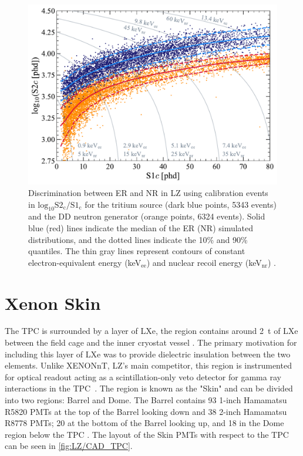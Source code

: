 \begin{figure}[!ht]
    \centering
    \includegraphics[width=0.7\linewidth]{figures/LZ/SR1WS_calOnly_0629.pdf}
    \caption[Discrimination between ER and NR in LZ using calibration events.]{Discrimination between ER and NR in LZ using calibration events in $\text{log}_{10}\text{S2}_{\text{c}}/\text{S1}_{\text{c}}$ for the tritium source (dark blue points, 5343 events) and the DD neutron generator (orange points, 6324 events). Solid blue (red) lines indicate the median of the ER (NR) simulated distributions, and the dotted lines indicate the 10\% and 90\% quantiles. The thin gray lines represent contours of constant electron-equivalent energy (keV$_{\text{ee}}$) and nuclear recoil energy (keV$_{\text{nr}}$) \cite{LZ:2022lsv}.}
    \label{fig:LZ/NRERBandExample}
\end{figure}

\section{Xenon Skin}\label{sec:LZ/Skin}
The TPC is surrounded by a layer of LXe, the region contains around 2~t of LXe between the field cage and the inner cryostat vessel \cite{LZNIMA}. The primary motivation for including this layer of LXe was to provide dielectric insulation between the two elements. Unlike XENONnT, LZ's main competitor, this region is instrumented for optical readout acting as a scintillation-only veto detector for gamma ray interactions in the TPC~\cite{XENON:2024wpa}. The region is known as the "Skin" and can be divided into two regions: Barrel and Dome. The Barrel contains 93 1-inch Hamamatsu R5820 PMTs at the top of the Barrel looking down and 38 2-inch Hamamatsu R8778 PMTs; 20 at the bottom of the Barrel looking up, and 18 in the Dome region below the TPC \cite{LZNIMA}. The layout of the Skin PMTs with respect to the TPC can be seen in \autoref{fig:LZ/CAD_TPC}.

